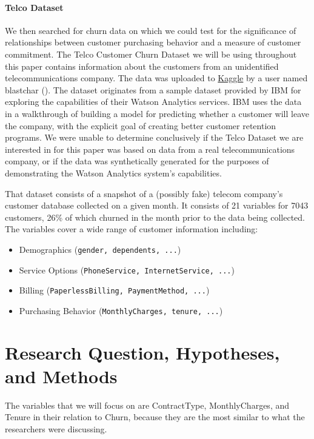 \documentclass[man, floatsintext]{apa6}
\begin{document}
\hspace{0.5mm}

\paragraph{Telco Dataset}

We then searched for churn data on which we could test for the significance of relationships between customer purchasing behavior and a measure of customer commitment. The Telco Customer Churn Dataset we will be using throughout this paper contains information about the customers from an unidentified telecommunications company. The data was uploaded to \href{https://www.kaggle.com/blastchar/telco-customer-churn}{Kaggle} by a user named blastchar (). The dataset originates from a sample dataset provided by IBM for exploring the capabilities of their Watson Analytics services. IBM uses the data in a walkthrough of building a model for predicting whether a customer will leave the company, with the explicit goal of creating better customer retention programs. \cite{ibm_telco_2015} We were unable to determine conclusively if the Telco Dataset we are interested in for this paper was based on data from a real telecommunications company, or if the data was synthetically generated for the purposes of demonstrating the Watson Analytics system's capabilities.

That dataset consists of a snapshot of a (possibly fake) telecom company's customer database collected on a given month. It consists of 21 variables for 7043 customers, 26\% of which churned in the month prior to the data being collected. The variables cover a wide range of customer information including:
\begin{itemize}
  \item Demographics (\texttt{gender, dependents, ...})
  \item Service Options (\texttt{PhoneService, InternetService, ...})
  \item Billing (\texttt{PaperlessBilling, PaymentMethod, ...})
  \item Purchasing Behavior (\texttt{MonthlyCharges, tenure, ...})
\end{itemize}

\section{Research Question, Hypotheses, and Methods}

The variables that we will focus on are ContractType, MonthlyCharges, and Tenure in their relation to Churn, because they are the most similar to what the researchers were discussing.
\end{document}
